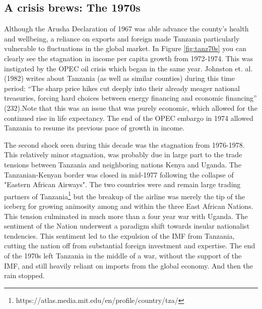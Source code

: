 \documentclass[12pt]{article}
\begin{document}
\subsection*{A crisis brews: The 1970s}
Although the Arusha Declaration of 1967 was able advance the county's health and wellbeing, a reliance on exports and foreign made Tanzania particularly vulnerable to fluctuations in the global market. In Figure \ref{fig:tanz70s} you can clearly see the stagnation in income per capita growth from 1972-1974. This was instigated by the OPEC oil crisis which began in the same year. Johnston et. al. (1982) writes about Tanzania (as well as similar counties) during this time period: ``The sharp price hikes cut deeply into their already meager national treasuries, forcing hard choices between energy financing and economic financing'' (232).Note that this was an issue that was purely economic, which allowed for the continued rise in life expectancy. The end of the OPEC embargo in 1974 allowed Tanzania to resume its previous pace of growth in income. 

The second shock seen during this decade was the stagnation from 1976-1978. This relatively minor stagnation, was probably due in large part to the trade tensions between Tanzania and neighboring nations Kenya and Uganda. The Tanzanian-Kenyan border was closed in mid-1977 following the collapse of "Eastern African Airways". The two countries were and remain large trading partners of Tanzania\footnote{https://atlas.media.mit.edu/en/profile/country/tza/} but the breakup of the airline was merely the tip of the iceberg for growing animosity among and within the three East African Nations. This tension culminated in much more than a four year war with Uganda. The sentiment of the Nation underwent a paradigm shift towards insular nationalist tendencies. This sentiment led to the expulsion  of the IMF from Tanzania, cutting the nation off from substantial foreign investment and expertise. The end of the 1970s left Tanzania in the middle of a war, without the support of the IMF, and still heavily reliant on imports from the global economy. And then the rain stopped. 
\end{document}
